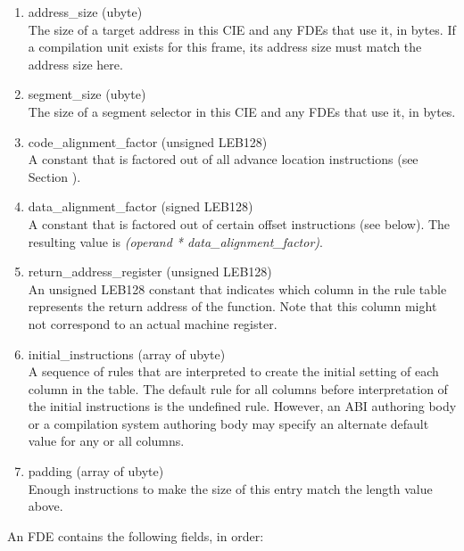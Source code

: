 \begin{enumerate}[1.]
\item  address\_size (ubyte) \\
The size of a target address in this CIE and any FDEs that
use it, in bytes. If a compilation unit exists for this frame,
its address size must match the address size here.

\item  segment\_size (ubyte) \\
The size of a segment selector in this CIE and any FDEs that
use it, in bytes.

\item  code\_alignment\_factor (unsigned LEB128) \\
A constant that is factored out of all advance location
instructions (see 
Section ).


\item  data\_alignment\_factor (signed LEB128) \\
A constant that is factored out of certain offset instructions
(see below). The resulting value is  \textit{(operand *
data\_alignment\_factor)}.

\item  return\_address\_register (unsigned LEB128) \\
An unsigned LEB128 constant that indicates which column in the
rule table represents the return address of the function. Note
that this column might not correspond to an actual machine
register.

\item initial\_instructions (array of ubyte) \\
A sequence of rules that are interpreted to create the initial
setting of each column in the table.  The default rule for
all columns before interpretation of the initial instructions
is the undefined rule. However, an ABI authoring body or a
compilation system authoring body may specify an alternate
default value for any or all columns.

\item padding (array of ubyte) \\
Enough  instructions to make the size of this entry
match the length value above.
\end{enumerate}

An FDE contains the following fields, in order:

